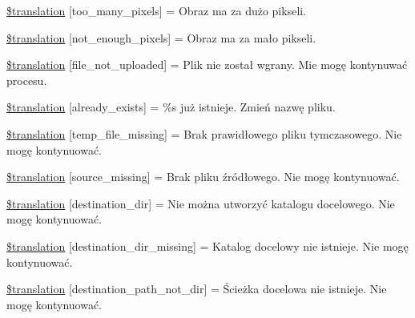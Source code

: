 \begin{DoxyCompactItemize}
\item 
\hyperlink{class_8upload_8pl___p_l_8php_aa4051ef64e94a3f8295c63cf85544016}{\$translation} \mbox{[}\textquotesingle{}too\+\_\+many\+\_\+pixels\textquotesingle{}\mbox{]} = \textquotesingle{}Obraz ma za dużo pikseli.\textquotesingle{}
\item 
\hyperlink{class_8upload_8pl___p_l_8php_a1fe342c27ce61f4ff4e0120ba647033e}{\$translation} \mbox{[}\textquotesingle{}not\+\_\+enough\+\_\+pixels\textquotesingle{}\mbox{]} = \textquotesingle{}Obraz ma za mało pikseli.\textquotesingle{}
\item 
\hyperlink{class_8upload_8pl___p_l_8php_a4ce76e7be0b3a03c2b47f6d70c21832e}{\$translation} \mbox{[}\textquotesingle{}file\+\_\+not\+\_\+uploaded\textquotesingle{}\mbox{]} = \textquotesingle{}Plik nie został wgrany. Mie mogę kontynuwać procesu.\textquotesingle{}
\item 
\hyperlink{class_8upload_8pl___p_l_8php_afd84e910217f04139f567c41e292afa5}{\$translation} \mbox{[}\textquotesingle{}already\+\_\+exists\textquotesingle{}\mbox{]} = \textquotesingle{}\%s już istnieje. Zmień nazwę pliku.\textquotesingle{}
\item 
\hyperlink{class_8upload_8pl___p_l_8php_ab0fa87a88aba2624004581eed0633325}{\$translation} \mbox{[}\textquotesingle{}temp\+\_\+file\+\_\+missing\textquotesingle{}\mbox{]} = \textquotesingle{}Brak prawidłowego pliku tymczasowego. Nie mogę kontynuować.\textquotesingle{}
\item 
\hyperlink{class_8upload_8pl___p_l_8php_aceaaf7355acaaf10f0ae60378d03c468}{\$translation} \mbox{[}\textquotesingle{}source\+\_\+missing\textquotesingle{}\mbox{]} = \textquotesingle{}Brak pliku źródłowego. Nie mogę kontynuować.\textquotesingle{}
\item 
\hyperlink{class_8upload_8pl___p_l_8php_aff2427c72a2598aefa6d58df1dd18b08}{\$translation} \mbox{[}\textquotesingle{}destination\+\_\+dir\textquotesingle{}\mbox{]} = \textquotesingle{}Nie można utworzyć katalogu docelowego. Nie mogę kontynuować.\textquotesingle{}
\item 
\hyperlink{class_8upload_8pl___p_l_8php_a9ef28d3cf09942c6c0a1e77fa09185e8}{\$translation} \mbox{[}\textquotesingle{}destination\+\_\+dir\+\_\+missing\textquotesingle{}\mbox{]} = \textquotesingle{}Katalog docelowy nie istnieje. Nie mogę kontynuować.\textquotesingle{}
\item 
\hyperlink{class_8upload_8pl___p_l_8php_a5704a67137126e8c87b7a364175929d4}{\$translation} \mbox{[}\textquotesingle{}destination\+\_\+path\+\_\+not\+\_\+dir\textquotesingle{}\mbox{]} = \textquotesingle{}Ścieżka docelowa nie istnieje. Nie mogę kontynuować.\textquotesingle{}

\end{DoxyCompactItemize}
